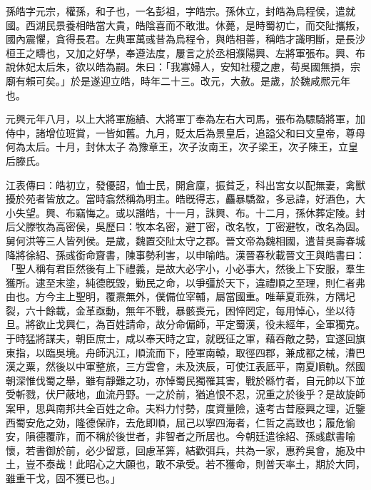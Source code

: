 
\begin{pinyinscope}
孫皓字元宗，權孫，和子也，一名彭祖，字皓宗。孫休立，封皓為烏程侯，遣就國。西湖民景養相皓當大貴，皓陰喜而不敢泄。休薨，是時蜀初亡，而交阯攜叛，國內震懼，貪得長君。左典軍萬彧昔為烏程令，與皓相善，稱皓才識明斷，是長沙桓王之疇也，又加之好學，奉遵法度，屢言之於丞相濮陽興、左將軍張布。興、布說休妃太后朱，欲以皓為嗣。朱曰：「我寡婦人，安知社稷之慮，苟吳國無損，宗廟有賴可矣。」於是遂迎立皓，時年二十三。改元，大赦。是歲，於魏咸熈元年也。

元興元年八月，以上大將軍施績、大將軍丁奉為左右大司馬，張布為驃騎將軍，加侍中，諸增位班賞，一皆如舊。九月，貶太后為景皇后，追謚父和曰文皇帝，尊母何為太后。十月，封休太子𩅦為豫章王，次子汝南王，次子梁王，次子陳王，立皇后滕氏。

江表傳曰：皓初立，發優詔，恤士民，開倉廩，振貧乏，科出宮女以配無妻，禽獸擾於苑者皆放之。當時翕然稱為明主。皓旣得志，麤暴驕盈，多忌諱，好酒色，大小失望。興、布竊悔之。或以譖皓，十一月，誅興、布。十二月，孫休葬定陵。封后父滕牧為高密侯，吳歷曰：牧本名密，避丁密，改名牧，丁密避牧，改名為固。舅何洪等三人皆列侯。是歲，魏置交阯太守之郡。晉文帝為魏相國，遣昔吳壽春城降將徐紹、孫彧銜命齎書，陳事勢利害，以申喻皓。漢晉春秋載晉文王與皓書曰：「聖人稱有君臣然後有上下禮義，是故大必字小，小必事大，然後上下安服，羣生獲所。逮至末塗，純德旣毀，勦民之命，以爭彊於天下，違禮順之至理，則仁者弗由也。方今主上聖明，覆燾無外，僕備位宰輔，屬當國重。唯華夏乖殊，方隅圮裂，六十餘載，金革亟動，無年不戰，暴骸喪元，困悴罔定，每用悼心，坐以待旦。將欲止戈興仁，為百姓請命，故分命偏師，平定蜀漢，役未經年，全軍獨克。于時猛將謀夫，朝臣庶士，咸以奉天時之宜，就旣征之軍，藉吞敵之勢，宜遂回旗東指，以臨吳境。舟師汎江，順流而下，陸軍南轅，取徑四郡，兼成都之械，漕巴漢之粟，然後以中軍整旅，三方雲會，未及浹辰，可使江表厎平，南夏順軌。然國朝深惟伐蜀之舉，雖有靜難之功，亦悼蜀民獨罹其害，戰於緜竹者，自元帥以下並受斬戮，伏尸蔽地，血流丹野。一之於前，猶追恨不忍，況重之於後乎？是故旋師案甲，思與南邦共全百姓之命。夫料力忖勢，度資量險，遠考古昔廢興之理，近鑒西蜀安危之効，隆德保祚，去危即順，屈己以寧四海者，仁哲之高致也；履危偷安，隕德覆祚，而不稱於後世者，非智者之所居也。今朝廷遣徐紹、孫彧獻書喻懷，若書御於前，必少留意，回慮革筭，結歡弭兵，共為一家，惠矜吳會，施及中土，豈不泰哉！此昭心之大願也，敢不承受。若不獲命，則普天率土，期於大同，雖重干戈，固不獲已也。」


\end{pinyinscope}
